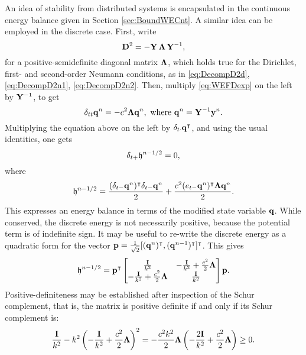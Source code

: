 An idea of stability from distributed systems is encapsulated in the continuous energy balance given in Section \ref{sec:BoundWECnt}. A similar idea can be employed in the discrete case. First, write
\begin{equation}
{\bf D}^2 = -{\bf Y} \, {\bf \Lambda} \, {\bf Y}^{-1},
\end{equation}
for a positive-semidefinite diagonal matrix ${\bf \Lambda}$, which holds true for the Dirichlet, first- and second-order Neumann conditions, as in \eqref{eq:DecompD2d}, \eqref{eq:DecompD2n1}, \eqref{eq:DecompD2n2}. Then, multiply \eqref{eq:WEFDexp} on the left by ${\bf Y}^{-1}$, to get
\begin{equation}
\delta_{tt} {\bf q}^n = -c^2 {\bf \Lambda} {\bf q}^n, \,\, \text{where }{\bf q}^n = {\bf Y}^{-1}{\bf y}^n.
\end{equation}
Multiplying the equation above on the left by $\delta_{t\cdot} {\bf q}^\intercal$, and using the usual identities, one gets
\begin{equation}
\delta_{t+} {\mathfrak h}^{n-1/2} = 0,
\end{equation}
where
\begin{equation}\label{eq:EnWaveEqnFD}
{\mathfrak h}^{n-1/2} = \frac{(\delta_{t-} {\bf q}^n)^\intercal \delta_{t-} {\bf q}^n}{2} + \frac{c^2(e_{t-} {\bf q}^n)^\intercal {\bf \Lambda} {\bf q}^n}{2}.
\end{equation}
This expresses an energy balance in terms of the modified state variable $\bf q$. While conserved, the discrete energy is not necessarily positive, because the potential term is of indefinite sign. It may be useful to re-write the discrete energy as a quadratic form for the vector ${\bf p} = \frac{1}{\sqrt{2}}[({\bf q}^n)^\intercal, ({\bf q}^{n-1})^\intercal]^\intercal$. This gives
\begin{equation}
{\mathfrak h}^{n-1/2} = {\bf p}^\intercal \begin{bmatrix}\frac{\bf I}{k^2} & -\frac{\bf I}{k^2}+\frac{c^2}{2}{\bf \Lambda} \\ -\frac{\bf I}{k^2}+\frac{c^2}{2}{\bf \Lambda} & \frac{\bf I}{k^2} \end{bmatrix}{\bf p}.
\end{equation}
Positive-definiteness may be established after inspection of the Schur complement, that is, the matrix is positive definite if and only if its Schur complement is:
\begin{equation}
\frac{\bf I}{k^2} - k^2 \left( -\frac{\bf I}{k^2}+\frac{c^2}{2}{\bf \Lambda}\right)^2 = -\frac{c^2k^2}{2}{\bf \Lambda}\left(-\frac{2{\bf I}}{k^2} + \frac{c^2}{2}{\bf \Lambda} \right) \geq 0.
\end{equation}
